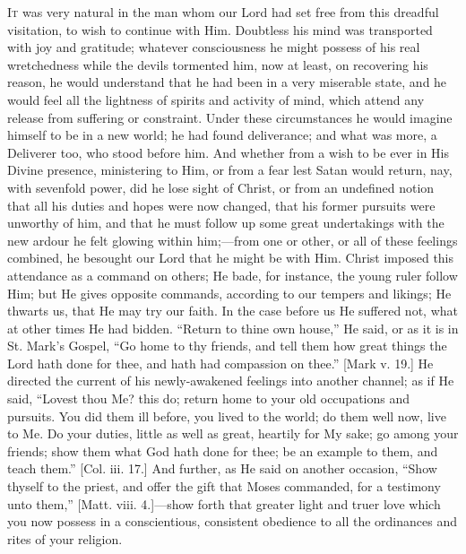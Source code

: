 I\textsc{t} was very natural in the man whom our Lord had set
free from this dreadful visitation, to wish to continue
with Him. Doubtless his mind was transported with joy and
gratitude; whatever consciousness he might possess of his
real wretchedness while the devils tormented him, now at
least, on recovering his reason, he would understand that
he had been in a very miserable state, and he would feel
all the lightness of spirits and activity of mind, which
attend any release from suffering or constraint. Under
these circumstances he would imagine himself to be in a
new world; he had found deliverance; and what was more, a
Deliverer too, who stood before him. And whether from a
wish to be ever in His Divine presence, ministering to
Him, or from a fear lest Satan would return, nay, with
sevenfold power, did he lose sight of Christ, or from an
undefined notion that all his duties and hopes were now
changed, that his former pursuits were unworthy of him,
and that he must follow up some great undertakings with
the new ardour he felt glowing within him;—from one
or other, or all of these feelings combined, he besought
our Lord that he might be with Him. Christ imposed this
attendance as a command on others; He bade, for instance,
the young ruler follow Him; but He gives opposite
commands, according to our tempers and likings; He
thwarts us, that He may try our faith. In the case before
us He suffered not, what at other times He had bidden.
``Return to thine own house,'' He said, or as it
is in St. Mark's Gospel, ``Go home to thy friends,
and tell them how great things the Lord hath done for
thee, and hath had compassion on thee.'' [Mark v.
19.] He directed the current of his newly-awakened
feelings into another channel; as if He said,
``Lovest thou Me? this do; return home to your old
occupations and pursuits. You did them ill before, you
lived to the world; do them well now, live to Me. Do your
duties, little as well as great, heartily for My sake; go
among your friends; show them what God hath done for
thee; be an example to them, and teach them.'' [Col.
iii. 17.] And further, as He said on another occasion,
``Show thyself to the priest, and offer the gift that
Moses commanded, for a testimony unto them,'' [Matt.
viii. 4.]—show forth that greater light and truer
love which you now possess in a conscientious, consistent
obedience to all the ordinances and rites of your
religion.

